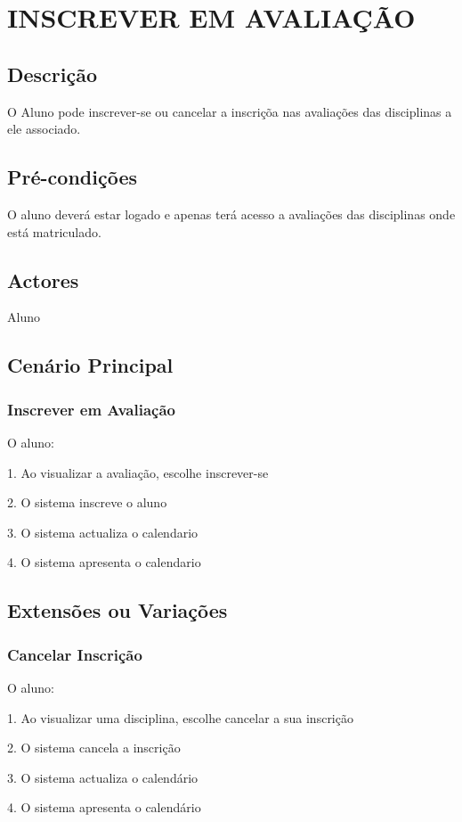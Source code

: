 \section{INSCREVER EM AVALIAÇÃO}

\subsection{Descrição}
O Aluno pode inscrever-se ou cancelar a inscriçõa nas avaliações das disciplinas a ele associado.

\subsection{Pré-condições}
O aluno deverá estar logado e apenas terá acesso a avaliações das disciplinas onde está matriculado.

\subsection{Actores}
Aluno

\subsection{Cenário Principal}

\subsubsection{Inscrever em Avaliação} 
O aluno:

1. Ao visualizar a avaliação, escolhe inscrever-se

2. O sistema inscreve o aluno

3. O sistema actualiza o calendario

4. O sistema apresenta o calendario


\subsection{Extensões ou Variações} 
\subsubsection{Cancelar Inscrição}

O aluno:

1. Ao visualizar uma disciplina, escolhe cancelar a sua inscrição

2. O sistema cancela a inscrição

3. O sistema actualiza o calendário

4. O sistema apresenta o calendário